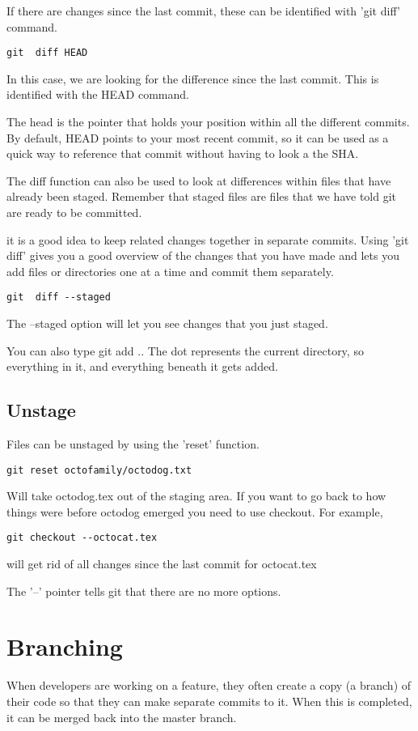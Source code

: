 \documentclass[11pt]{article} %
\begin{document}
If there are changes since the last commit, these can be identified with 'git diff' command. 
\begin{lstlisting}
git  diff HEAD
\end{lstlisting}

In this case, we are looking for the difference since the last commit. This is identified with the HEAD command. 

The head is the pointer that holds your position within all the different commits.  By default, HEAD points to your most recent commit, so it can be used as a quick way to reference that commit without having to look a the SHA.  

The diff function can also be used to look at differences within files that have already been staged.  Remember that staged files are files that we have told git are ready to be committed. 

it is a good idea to keep related changes together in separate commits.  Using 'git diff' gives you a good overview of the changes that you have made and lets you add files or directories one at a time and commit them separately.

\begin{lstlisting}
git  diff --staged
\end{lstlisting}
The --staged option will let you see changes that you just staged.  

You can also type git add .. The dot represents the current directory, so everything in it, and everything beneath it gets added.

\subsection{Unstage}
Files can be unstaged by using the 'reset' function.  

\begin{lstlisting}
git reset octofamily/octodog.txt  
\end{lstlisting}
Will take octodog.tex out of the staging area.  If you want to go back to how things were before octodog emerged you need to use checkout. For example, 
\begin{lstlisting}
git checkout --octocat.tex
\end{lstlisting}
will get rid of all changes since the last commit for octocat.tex

The '--' pointer tells git that there are no more options.  

\section{Branching}
When developers are working on a feature, they often create a copy (a branch) of their code so that they can make separate commits to it.  When this is completed, it can be merged back into the master branch. 
\end{document}
